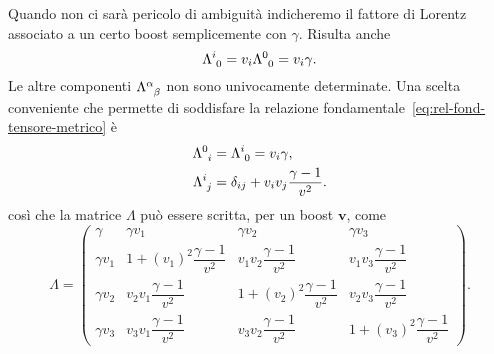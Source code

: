 Quando non ci sarà pericolo di ambiguità indicheremo il fattore di Lorentz
associato a un certo boost semplicemente con $\gamma$.  Risulta anche
\begin{equation}
  \tensor{\Lambda}{^{i}_{0}} = v_{i}\tensor{\Lambda}{^{0}_{0}} = v_{i}\gamma.
\end{equation}
Le altre componenti $\tensor{\Lambda}{^{\alpha}_{\beta}}$ non sono univocamente
determinate.  Una scelta conveniente che permette di soddisfare
la relazione fondamentale~\eqref{eq:rel-fond-tensore-metrico} è
\begin{subequations}
  \begin{align}
    \tensor{\Lambda}{^{0}_{i}} &= \tensor{\Lambda}{^{i}_{0}} = v_{i}\gamma, \\
    \tensor{\Lambda}{^{i}_{j}} &= \delta_{ij} +
    v_{i}v_{j}\frac{\gamma-1}{v^{2}}.
  \end{align}
\end{subequations}
così che la matrice $\Lambda$ può essere scritta, per un boost
$\bm{v}$, come
\begin{equation}
  \Lambda =
  \begin{pmatrix}
    \gamma & \gamma v_{1} & \gamma v_{2} & \gamma v_{3} \\[2.0ex]
    \gamma v_{1} & 1 + (v_{1})^{2}\dfrac{\gamma-1}{v^{2}} &
    v_{1}v_{2}\dfrac{\gamma-1}{v^{2}} & v_{1} v_{3}\dfrac{\gamma-1}{v^{2}}
    \\[2.0ex]
    \gamma v_{2} & v_{2}v_{1}\dfrac{\gamma-1}{v^{2}} & 1 +
    (v_{2})^{2}\dfrac{\gamma-1}{v^{2}} & v_{2}v_{3}\dfrac{\gamma-1}{v^{2}}
    \\[2.0ex]
    \gamma v_{3} & v_{3}v_{1}\dfrac{\gamma-1}{v^{2}} &
    v_{3}v_{2}\dfrac{\gamma-1}{v^{2}} & 1 + (v_{3})^{2}\dfrac{\gamma-1}{v^{2}}
  \end{pmatrix}.
\end{equation}

